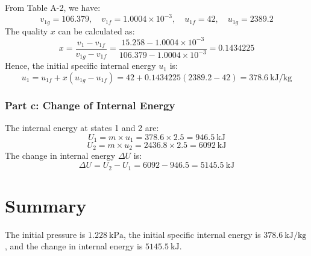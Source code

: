 \documentclass[12pt, letterpaper]{article}
\begin{document}
From Table A-2, we have:
\[
v_{1g} = 106.379, \quad v_{1f} = 1.0004 \times 10^{-3}, \quad u_{1f} = 42, \quad u_{1g} = 2389.2
\]
The quality \(x\) can be calculated as:
\[
x = \frac{v_1 - v_{1f}}{v_{1g} - v_{1f}} = \frac{15.258 - 1.0004 \times 10^{-3}}{106.379 - 1.0004 \times 10^{-3}} = 0.1434225
\]
Hence, the initial specific internal energy \(u_1\) is:
\[
u_1 = u_{1f} + x(u_{1g} - u_{1f}) = 42 + 0.1434225(2389.2 - 42) = \SI{378.6}{\kJ/\kg}
\]

\subsubsection*{Part c: Change of Internal Energy}

The internal energy at states 1 and 2 are:
\[
U_1 = m \times u_1 = 378.6 \times 2.5 = \SI{946.5}{\kJ}
\]
\[
U_2 = m \times u_2 = 2436.8 \times 2.5 = \SI{6092}{\kJ}
\]
The change in internal energy \(\Delta U\) is:
\[
\Delta U = U_2 - U_1 = 6092 - 946.5 = \SI{5145.5}{\kJ}
\]

\section*{Summary}

The initial pressure is \(\SI{1.228}{\kPa}\), the initial specific internal energy is \(\SI{378.6}{\kJ/\kg}\), and the change in internal energy is \(\SI{5145.5}{\kJ}\).
\end{document}
